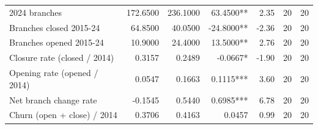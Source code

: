 \begin{tabular}{lrrrrrr}
2024 branches & 172.6500 & 236.1000 & 63.4500** & 2.35 & 20 & 20 \\
Branches closed 2015-24 & 64.8500 & 40.0500 & -24.8000** & -2.36 & 20 & 20 \\
Branches opened 2015-24 & 10.9000 & 24.4000 & 13.5000** & 2.76 & 20 & 20 \\
Closure rate (closed / 2014) & 0.3157 & 0.2489 & -0.0667* & -1.90 & 20 & 20 \\
Opening rate (opened / 2014) & 0.0547 & 0.1663 & 0.1115*** & 3.60 & 20 & 20 \\
Net branch change rate & -0.1545 & 0.5440 & 0.6985*** & 6.78 & 20 & 20 \\
Churn (open + close) / 2014 & 0.3706 & 0.4163 & 0.0457 & 0.99 & 20 & 20 \\
\bottomrule
\end{tabular}

